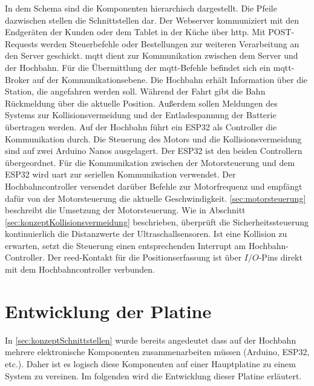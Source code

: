 In dem Schema sind die Komponenten hierarchisch dargestellt. Die Pfeile dazwischen stellen die Schnittstellen dar. Der Webserver kommuniziert mit den Endgeräten der Kunden oder dem Tablet in der Küche über \acrshort{http}. Mit POST-Requests werden Steuerbefehle oder Bestellungen zur weiteren Verarbeitung an den Server geschickt.
\acrshort{mqtt} dient zur Kommunikation zwischen dem Server und der Hochbahn. Für die Übermittlung der \acrshort{mqtt}-Befehle  befindet sich ein \acrshort{mqtt}-Broker auf der Kommunikationsebene. Die Hochbahn erhält Information über die Station, die angefahren werden soll. Während der Fahrt gibt die Bahn Rückmeldung über die aktuelle Position. Außerdem sollen Meldungen des Systems zur Kollisionsvermeidung und der Entladespannung der Batterie übertragen werden. Auf der Hochbahn führt ein ESP32 als Controller die Kommunikation durch. Die Steuerung des Motors und die Kollisionsvermeidung sind auf zwei Arduino Nanos ausgelagert. Der ESP32 ist den beiden Controllern übergeordnet. Für die Kommunikation zwischen der Motorsteuerung und dem ESP32 wird \acrshort{uart} zur seriellen Kommunikation verwendet. Der Hochbahncontroller versendet darüber Befehle zur Motorfrequenz und empfängt dafür von der Motorsteuerung die aktuelle Geschwindigkeit. \autoref{sec:motorsteuerung} beschreibt die Umsetzung der Motorsteuerung. Wie in Abschnitt \ref{sec:konzeptKollisionsvermeidung} beschrieben, überprüft die Sicherheitssteuerung kontinuierlich die Distanzwerte der Ultraschallsensoren. Ist eine Kollision zu erwarten, setzt die Steuerung einen entsprechenden Interrupt am Hochbahn-Controller. Der \acrshort{reed}-Kontakt für die Positionserfassung ist über $I/O$-Pins direkt mit dem Hochbahncontroller verbunden. 

\chapter{Entwicklung der Platine}
\label{sec:ecardConcept}
In \autoref{sec:konzeptSchnittstellen} wurde bereits angedeutet dass auf der Hochbahn mehrere elektronische Komponenten zusammenarbeiten müssen (Arduino, ESP32, etc.). Daher ist es logisch diese Komponenten auf einer Hauptplatine zu einem System zu vereinen. 
Im folgenden wird die Entwicklung dieser Platine erläutert.


